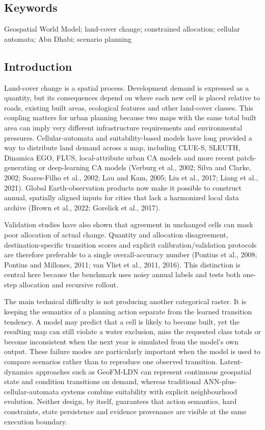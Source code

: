 \subsection{Keywords}\label{keywords}

Geospatial World Model; land-cover change; constrained allocation;
cellular automata; Abu Dhabi; scenario planning

\subsection{Introduction}\label{introduction}

Land-cover change is a spatial process. Development demand is expressed
as a quantity, but its consequences depend on where each new cell is
placed relative to roads, existing built areas, ecological features and
other land-cover classes. This coupling matters for urban planning
because two maps with the same total built area can imply very different
infrastructure requirements and environmental pressures.
Cellular-automata and suitability-based models have long provided a way
to distribute land demand across a map, including CLUE-S, SLEUTH,
Dinamica EGO, FLUS, local-attribute urban CA models and more recent
patch-generating or deep-learning CA models (Verburg et al., 2002; Silva
and Clarke, 2002; Soares-Filho et al., 2002; Lau and Kam, 2005; Liu et
al., 2017; Liang et al., 2021). Global Earth-observation products now
make it possible to construct annual, spatially aligned inputs for
cities that lack a harmonized local data archive (Brown et al., 2022;
Gorelick et al., 2017).

Validation studies have also shown that agreement in unchanged cells can
mask poor allocation of actual change. Quantity and allocation
disagreement, destination-specific transition scores and explicit
calibration/validation protocols are therefore preferable to a single
overall-accuracy number (Pontius et al., 2008; Pontius and Millones,
2011; van Vliet et al., 2011, 2016). This distinction is central here
because the benchmark uses noisy annual labels and tests both one-step
allocation and recursive rollout.

The main technical difficulty is not producing another categorical
raster. It is keeping the semantics of a planning action separate from
the learned transition tendency. A model may predict that a cell is
likely to become built, yet the resulting map can still violate a water
exclusion, miss the requested class totals or become inconsistent when
the next year is simulated from the model's own output. These failure
modes are particularly important when the model is used to compare
scenarios rather than to reproduce one observed transition.
Latent-dynamics approaches such as GeoFM-LDN can represent continuous
geospatial state and condition transitions on demand, whereas
traditional ANN-plus-cellular-automata systems combine suitability with
explicit neighbourhood evolution. Neither design, by itself, guarantees
that action semantics, hard constraints, state persistence and evidence
provenance are visible at the same execution boundary.

